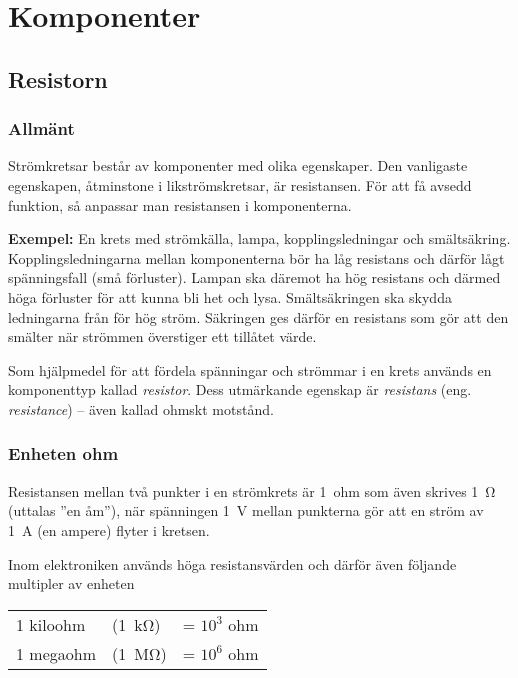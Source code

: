 \chapter{Komponenter}
\label{komponenter}

\section{Resistorn}
\label{resistorn}

\subsection{Allmänt}

Strömkretsar består av komponenter med olika egenskaper.
Den vanligaste egenskapen, åtminstone i likströmskretsar, är resistansen.
För att få avsedd funktion, så anpassar man resistansen i komponenterna.

\textbf{Exempel:} En krets med strömkälla, lampa, kopplingsledningar och smältsäkring.
Kopplingsledningarna mellan komponenterna bör ha låg resistans och därför lågt
spänningsfall (små förluster).
Lampan ska däremot ha hög resistans och därmed höga förluster för att kunna bli
het och lysa.
Smältsäkringen ska skydda ledningarna från för hög ström.
Säkringen ges därför en resistans som gör att den smälter när strömmen
överstiger ett tillåtet värde.

Som hjälpmedel för att fördela spänningar och strömmar i en krets används
en komponenttyp kallad \emph{resistor}.
Dess utmärkande egenskap är \emph{resistans} (eng. \emph{resistance}) --
även kallad ohmskt motstånd.

\subsection{Enheten ohm}
\label{enheten_ohm}


Resistansen mellan två punkter i en strömkrets är 1~ohm som även skrives
\SI{1}{\ohm} (uttalas ''en åm''), när spänningen \SI{1}{\volt} mellan punkterna
gör att en ström av \SI{1}{\ampere} (en ampere) flyter i kretsen.

Inom elektroniken används höga resistansvärden och därför även följande
multipler av enheten

\begin{center}
\begin{tabular}{lll}
  1 kiloohm & (\SI{1}{\kilo\ohm}) & = \(10^3\) ohm \\
  1 megaohm & (\SI{1}{\mega\ohm}) & = \(10^6\) ohm \\
\end{tabular}
\end{center}

